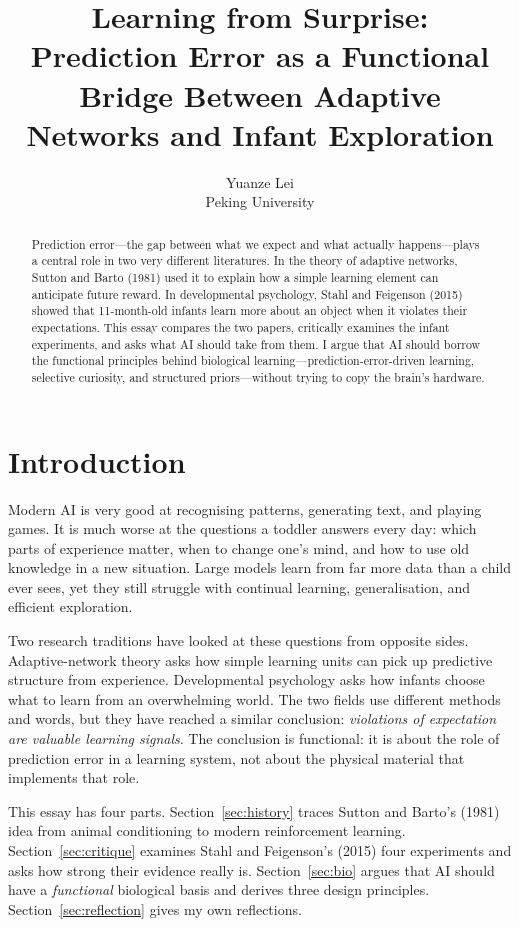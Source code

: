 \documentclass{article}
\title{Learning from Surprise:\\
Prediction Error as a Functional Bridge Between Adaptive Networks and Infant Exploration}
\author{%
  Yuanze Lei \quad 2510124204\\
  Peking University
}
\begin{document}
\maketitle

\begin{abstract}
Prediction error---the gap between what we expect and what actually happens---plays a
central role in two very different literatures. In the theory of adaptive networks, Sutton
and Barto (1981) used it to explain how a simple learning element can anticipate future
reward. In developmental psychology, Stahl and Feigenson (2015) showed that 11-month-old
infants learn more about an object when it violates their expectations. This essay compares
the two papers, critically examines the infant experiments, and asks what AI should take
from them. I argue that AI should borrow the functional principles behind biological
learning---prediction-error-driven learning, selective curiosity, and structured
priors---without trying to copy the brain's hardware.
\end{abstract}

\section{Introduction}\label{sec:intro}

Modern AI is very good at recognising patterns, generating text, and playing games. It is
much worse at the questions a toddler answers every day: which parts of experience matter,
when to change one's mind, and how to use old knowledge in a new situation. Large models
learn from far more data than a child ever sees, yet they still struggle with continual
learning, generalisation, and efficient exploration.

Two research traditions have looked at these questions from opposite sides. Adaptive-network
theory asks how simple learning units can pick up predictive structure from experience.
Developmental psychology asks how infants choose what to learn from an overwhelming world.
The two fields use different methods and words, but they have reached a similar conclusion:
\emph{violations of expectation are valuable learning signals}. The conclusion is
functional: it is about the role of prediction error in a learning system, not about the
physical material that implements that role.

This essay has four parts. Section~\ref{sec:history} traces Sutton and Barto's (1981) idea
from animal conditioning to modern reinforcement learning. Section~\ref{sec:critique}
examines Stahl and Feigenson's (2015) four experiments and asks how strong their evidence
really is. Section~\ref{sec:bio} argues that AI should have a \emph{functional} biological
basis and derives three design principles. Section~\ref{sec:reflection} gives my own
reflections.
\end{document}
